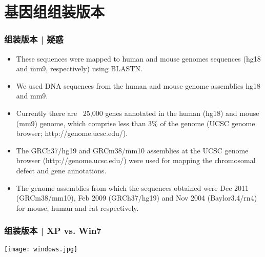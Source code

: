 \documentclass[table]{beamer}
\begin{document}
\section{基因组组装版本}
\begin{frame}
  \frametitle{组装版本 | 疑惑}
  \begin{itemize}
    \item These sequences were mapped to human and mouse genomes sequences (\alert{hg18 and mm9}, respectively) using BLASTN.
    \item We used DNA sequences from the human and mouse genome assemblies \alert{hg18 and mm9}.
    \item Currently there are ~25,000 genes annotated in the human (\alert{hg18}) and mouse (\alert{mm9}) genome, which comprise less than 3\% of the genome (UCSC genome browser; http://genome.ucsc.edu/).
    \item The \alert{GRCh37/hg19 and GRCm38/mm10} assemblies at the UCSC genome browser (http://genome.ucsc.edu/) were used for mapping the chromosomal defect and gene annotations.
    \item The genome assemblies from which the sequences obtained were Dec 2011 (\alert{GRCm38/mm10}), Feb 2009 (\alert{GRCh37/hg19}) and Nov 2004 (\alert{Baylor3.4/rn4}) for mouse, human and rat respectively.
  \end{itemize}
\end{frame}

\begin{frame}
  \frametitle{组装版本 | XP vs. Win7}
  \begin{center}
    \texttt{[image: windows.jpg]}
  \end{center}
\end{frame}
\end{document}

